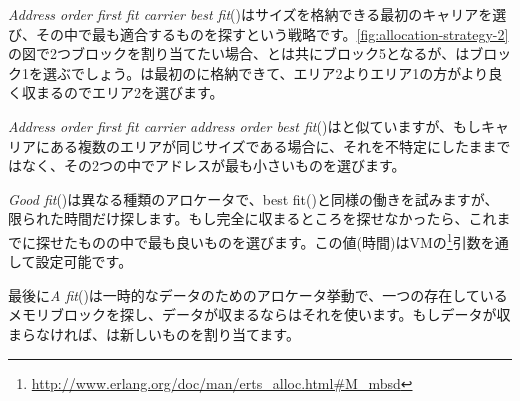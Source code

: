 \emph{Address order first fit carrier best fit}()はサイズを格納できる最初のキャリアを選び、その中で最も適合するものを探すという戦略です。\ref{fig:allocation-strategy-2}の図で2つブロックを割り当てたい場合、とは共にブロック5となるが、はブロック1を選ぶでしょう。は最初のに格納できて、エリア2よりエリア1の方がより良く収まるのでエリア2を選びます。

\emph{Address order first fit carrier address order best fit}()はと似ていますが、もしキャリアにある複数のエリアが同じサイズである場合に、それを不特定にしたままではなく、その2つの中でアドレスが最も小さいものを選びます。

\emph{Good fit}()は異なる種類のアロケータで、best fit()と同様の働きを試みますが、限られた時間だけ探します。もし完全に収まるところを探せなかったら、これまでに探せたものの中で最も良いものを選びます。この値(時間)はVMの\footnote{\href{http://www.erlang.org/doc/man/erts\_alloc.html\#M\_mbsd}{http://www.erlang.org/doc/man/erts\_alloc.html\#M\_mbsd}}引数を通して設定可能です。

最後に\emph{A fit}()は一時的なデータのためのアロケータ挙動で、一つの存在しているメモリブロックを探し、データが収まるならはそれを使います。もしデータが収まらなければ、は新しいものを割り当てます。

